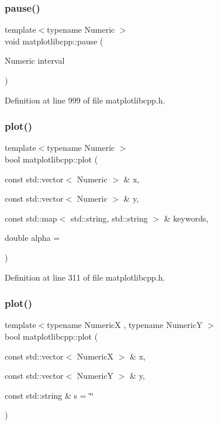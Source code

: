 \subsubsection{\texorpdfstring{pause()}{pause()}}
{\footnotesize\ttfamily template$<$typename Numeric $>$ \\
void matplotlibcpp\+::pause (\begin{DoxyParamCaption}\item[{Numeric}]{interval }\end{DoxyParamCaption})\hspace{0.3cm}{\ttfamily [inline]}}



Definition at line 999 of file matplotlibcpp.\+h.

\mbox{\label{namespacematplotlibcpp_a43b8f4e1cf62c2e9de4ece52fb4bfadf}} 
\subsubsection{\texorpdfstring{plot()}{plot()}\hspace{0.1cm}{\footnotesize\ttfamily [1/3]}}
{\footnotesize\ttfamily template$<$typename Numeric $>$ \\
bool matplotlibcpp\+::plot (\begin{DoxyParamCaption}\item[{const std\+::vector$<$ Numeric $>$ \&}]{x,  }\item[{const std\+::vector$<$ Numeric $>$ \&}]{y,  }\item[{const std\+::map$<$ std\+::string, std\+::string $>$ \&}]{keywords,  }\item[{double}]{alpha = {} }\end{DoxyParamCaption})}



Definition at line 311 of file matplotlibcpp.\+h.

\mbox{\label{namespacematplotlibcpp_a19804a8cbd413b15c8d07848d7a5890e}} 
\subsubsection{\texorpdfstring{plot()}{plot()}\hspace{0.1cm}{\footnotesize\ttfamily [2/3]}}
{\footnotesize\ttfamily template$<$typename NumericX , typename NumericY $>$ \\
bool matplotlibcpp\+::plot (\begin{DoxyParamCaption}\item[{const std\+::vector$<$ NumericX $>$ \&}]{x,  }\item[{const std\+::vector$<$ NumericY $>$ \&}]{y,  }\item[{const std\+::string \&}]{s = {\ttfamily \char`\"{}\char`\"{}} }\end{DoxyParamCaption})}



